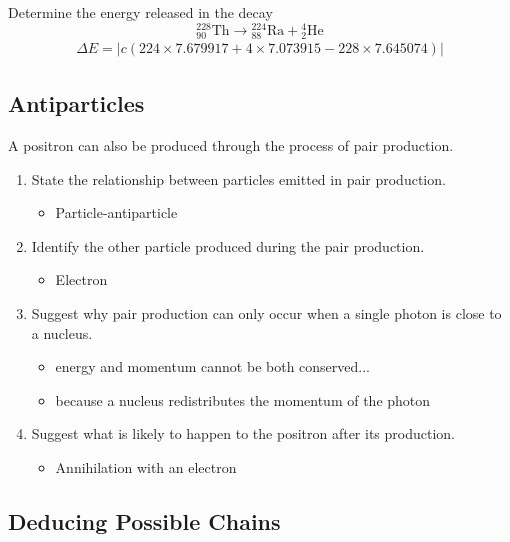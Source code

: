 \documentclass[a4paper,12pt]{article}
\newcommand{\atom}[3]{{}^{#1}_{#2}\text{#3}}
\begin{document}
Determine the energy released in the decay
$$\atom{228}{90}{Th} \rightarrow \atom{224}{88}{Ra} + \atom{4}{2}{He}$$
\begin{align}
  \Delta E = \left\vert c(224 \times 7.679917 + 4\times 7.073915 - 228 \times 7.645074)\right\vert
\end{align}

\pagebreak

\subsection{Antiparticles}

A positron can also be produced through the process of pair
production.

\begin{enumerate}[label=(\alph*)]
  \item State the relationship between particles emitted in pair production.
        \begin{itemize}
          \item Particle-antiparticle
        \end{itemize}
  \item Identify the other particle produced during the pair production.
        \begin{itemize}
          \item Electron
        \end{itemize}
  \item Suggest why pair production can only occur when a single photon is close to a nucleus.
        \begin{itemize}
          \item energy and momentum cannot be both conserved...
          \item because a nucleus redistributes the momentum of the photon
        \end{itemize}
  \item Suggest what is likely to happen to the positron after its production.
        \begin{itemize}
          \item Annihilation with an electron
        \end{itemize}

\end{enumerate}

\pagebreak

\subsection{Deducing Possible Chains}
\end{document}
